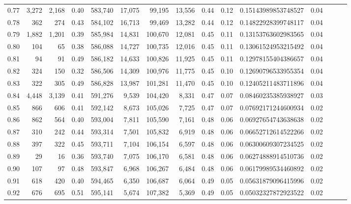 \begin{tabular}{rrrrrrrrrrrrrrr}
0.77 &   3,272 &   2,168 &  0.40 &  583,740 &   17,075 &   99,195 &   13,556 &  0.44 &  0.12 &   0.15143989853748527 &      0.04 \\
0.78 &     362 &     274 &  0.43 &  584,102 &   16,713 &   99,469 &   13,282 &  0.44 &  0.12 &   0.14822928399748117 &      0.04 \\
0.79 &   1,882 &   1,201 &  0.39 &  585,984 &   14,831 &  100,670 &   12,081 &  0.45 &  0.11 &   0.13153763602983565 &      0.04 \\
0.80 &     104 &      65 &  0.38 &  586,088 &   14,727 &  100,735 &   12,016 &  0.45 &  0.11 &   0.13061524953215492 &      0.04 \\
0.81 &      94 &      91 &  0.49 &  586,182 &   14,633 &  100,826 &   11,925 &  0.45 &  0.11 &   0.12978155404386657 &      0.04 \\
0.82 &     324 &     150 &  0.32 &  586,506 &   14,309 &  100,976 &   11,775 &  0.45 &  0.10 &   0.12690796533955354 &      0.04 \\
0.83 &     322 &     305 &  0.49 &  586,828 &   13,987 &  101,281 &   11,470 &  0.45 &  0.10 &   0.12405211483711896 &      0.04 \\
0.84 &   4,448 &   3,139 &  0.41 &  591,276 &    9,539 &  104,420 &    8,331 &  0.47 &  0.07 &   0.08460235385938927 &      0.03 \\
0.85 &     866 &     606 &  0.41 &  592,142 &    8,673 &  105,026 &    7,725 &  0.47 &  0.07 &   0.07692171244600934 &      0.02 \\
0.86 &     862 &     564 &  0.40 &  593,004 &    7,811 &  105,590 &    7,161 &  0.48 &  0.06 &   0.06927654743638638 &      0.02 \\
0.87 &     310 &     242 &  0.44 &  593,314 &    7,501 &  105,832 &    6,919 &  0.48 &  0.06 &   0.06652712614522266 &      0.02 \\
0.88 &     397 &     322 &  0.45 &  593,711 &    7,104 &  106,154 &    6,597 &  0.48 &  0.06 &   0.06300609307234525 &      0.02 \\
0.89 &      29 &      16 &  0.36 &  593,740 &    7,075 &  106,170 &    6,581 &  0.48 &  0.06 &   0.06274888914510736 &      0.02 \\
0.90 &     107 &      97 &  0.48 &  593,847 &    6,968 &  106,267 &    6,484 &  0.48 &  0.06 &   0.06179989534460892 &      0.02 \\
0.91 &     618 &     420 &  0.40 &  594,465 &    6,350 &  106,687 &    6,064 &  0.49 &  0.05 &   0.05631879096415996 &      0.02 \\
0.92 &     676 &     695 &  0.51 &  595,141 &    5,674 &  107,382 &    5,369 &  0.49 &  0.05 &   0.05032327872923522 &      0.02 \\

\end{tabular}
